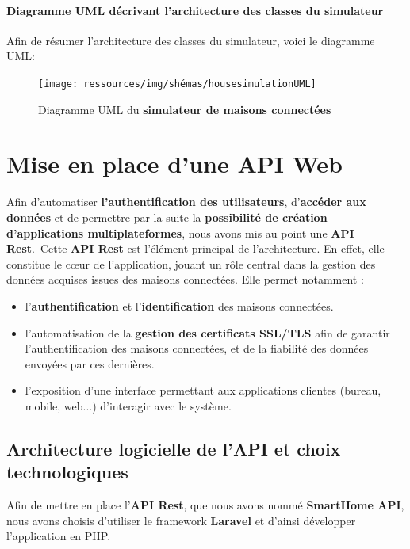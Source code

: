 \documentclass[10pt, a4paper]{report}
\begin{document}
	\paragraph{Diagramme UML décrivant l'architecture des classes du simulateur\\} 
	Afin de résumer l'architecture des classes du simulateur, voici le diagramme UML:

		\begin{figure}[h!]
		\centering
		\texttt{[image: ressources/img/shémas/housesimulationUML]}
		\caption{Diagramme UML du \textbf{simulateur de maisons connectées}}
		\label{fig:umlMaisonConnectées}
		\end{figure}
	
	\section{Mise en place d'une API Web}
	Afin d'automatiser \textbf{l'authentification des utilisateurs}, d'\textbf{accéder aux données} et de permettre par la suite la \textbf{possibilité de création d'applications multiplateformes}, nous avons mis au point une \textbf{API Rest}.\
	Cette \textbf{API Rest} est l'élément principal de l'architecture. En effet, elle constitue le cœur de l’application, jouant un rôle central dans la gestion des données acquises issues des maisons connectées. Elle permet notamment :

	\begin{itemize}
		\item l’\textbf{authentification} et l’\textbf{identification} des maisons connectées.
		\item l’automatisation de la \textbf{gestion des certificats SSL/TLS} afin de garantir l'authentification des maisons connectées, et de la fiabilité des données envoyées par ces dernières.
		\item l’exposition d’une interface permettant aux applications clientes (bureau, mobile, web...) d’interagir avec le système.
	\end{itemize} 

	\subsection{Architecture logicielle de l'API et choix technologiques}
	
	Afin de mettre en place l'\textbf{API Rest}, que nous avons nommé \textbf{SmartHome API}, nous avons choisis d'utiliser le framework \textbf{Laravel} et d'ainsi développer l'application en PHP.
	
\end{document}
